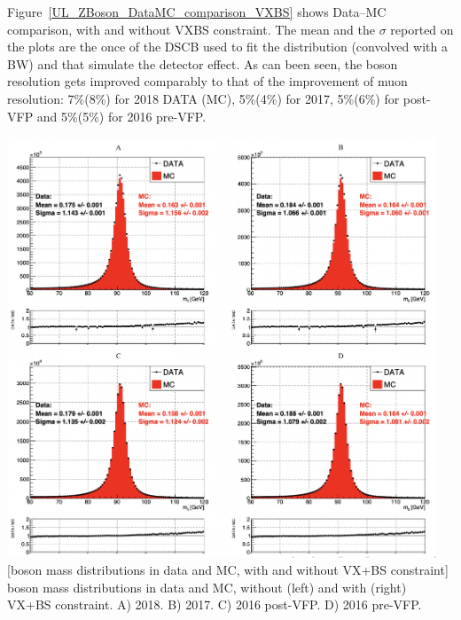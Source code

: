 Figure~\ref{UL_ZBoson_DataMC_comparison_VXBS} shows Data--MC comparison, with and without VXBS constraint.
The mean and the $\sigma$ reported on the plots are the once of the DSCB used to fit the distribution (convolved with a BW) and that simulate the detector effect.
As can been seen, the \PZ boson resolution gets improved comparably to that of the improvement of muon \pT resolution:
7\%(8\%) for 2018 DATA (MC), 5\%(4\%) for 2017, 5\%(6\%) for post-VFP and 5\%(5\%) for 2016 pre-VFP. 
\begin{multiFigure}
    \centering
        \includegraphics[width=0.96\textwidth]{figures/higgsmassmeas/vxbs/vxbs_mZdist_2017_2018.png}
        [\PZ boson mass distributions in data and MC, with and without VX+BS constraint]
        {\PZ boson mass distributions in data and MC, without (left) and with (right) VX+BS constraint. %
        \;A) 2018.
        \;B) 2017.
        \;C) 2016 post-VFP.
        \;D) 2016 pre-VFP.} %
\label{UL_ZBoson_DataMC_comparison_VXBS}
\end{multiFigure}


